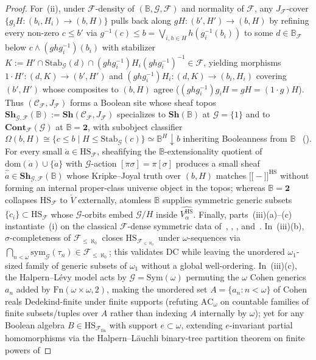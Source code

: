 \documentclass[10pt,twoside,openright]{book}
\providecommand{\llbracket}{\mathopen{[\![}}
\providecommand{\rrbracket}{\mathclose{]\!]}}
\theoremstyle{crmplain}
\theoremstyle{crmdef}
\theoremstyle{crmremark}
\begin{document}
\begin{proof}
For~(ii), under $\mathcal{F}$-density of $(\mathbb{B}, \mathcal{G}, \mathcal{F})$ and normality of $\mathcal{F}$, any $J_{\mathcal{F}}$-cover $\{g_i H : (b_i, H_i) \to (b, H)\}$ pulls back along $g H : (b', H') \to (b, H)$ by refining every non-zero $c \le b'$ via $g^{-1}(c) \le b = \bigvee_{i, h \in H} h(g_i^{-1}(b_i))$ to some $d \in \mathbb{B}_{\mathcal{F}}$ below $c \wedge (g h g_i^{-1})(b_i)$ with stabilizer $K := H' \cap \mathrm{Stab}_{\mathcal{G}}(d) \cap (g h g_i^{-1}) H_i (g h g_i^{-1})^{-1} \in \mathcal{F}$, yielding morphisms $1 \cdot H' : (d, K) \to (b', H')$ and $(g h g_i^{-1}) H_i : (d, K) \to (b_i, H_i)$ covering $(b', H')$ whose composites to $(b, H)$ agree ($(g h g_i^{-1}) g_i H = g H = (1 \cdot g) H$). Thus $(\mathcal{C}_{\mathcal{F}}, J_{\mathcal{F}})$ forms a Boolean site whose sheaf topos $\mathbf{Sh}_{\mathcal{G}, \mathcal{F}}(\mathbb{B}) := \mathbf{Sh}(\mathcal{C}_{\mathcal{F}}, J_{\mathcal{F}})$ specializes to $\mathbf{Sh}(\mathbb{B})$ at $\mathcal{G} = \{1\}$ and to $\mathbf{Cont}_{\mathcal{F}}(\mathcal{G})$ at $\mathbb{B} = \mathbf{2}$, with subobject classifier $\Omega(b, H) \cong \{c \le b \mid H \le \mathrm{Stab}_{\mathcal{G}}(c)\} \simeq \mathbb{B}^H{\downarrow}b$ inheriting Booleanness from $\mathbb{B}$~\cite{Fourman80} (\cite[\S D4.5]{Johnstone02}). For every small $\dot{a} \in \mathrm{HS}_{\mathcal{F}}$, sheafifying the $\mathbb{B}$-extensionality quotient of $\mathrm{dom}(\dot{a}) \cup \{\dot{a}\}$ with $\mathcal{G}$-action $[\pi\sigma] = \pi[\sigma]$ produces a small sheaf $\widehat{\dot{a}} \in \mathbf{Sh}_{\mathcal{G}, \mathcal{F}}(\mathbb{B})$ whose Kripke--Joyal truth over $(b, H)$ matches $\llbracket - \rrbracket^{\mathrm{HS}}$ without forming an internal proper-class universe object in the topos; whereas $\mathbb{B} = \mathbf{2}$ collapses $\mathrm{HS}_{\mathcal{F}}$ to $\check{V}$ externally, atomless $\mathbb{B}$ supplies symmetric generic subsets $\{\dot{c}_i\} \subset \mathrm{HS}_{\mathcal{F}}$ whose $\mathcal{G}$-orbits embed $\mathcal{G}/H$ inside $\widehat{V_\alpha^{\mathrm{HS}}}$. Finally, parts~(iii)(a)--(c) instantiate~(i) on the classical $\mathcal{F}$-dense symmetric data of~\cite[Chs.~5, 7, 10 \& \S 8.1]{Jech73}, \cite{HalpernLevy71}, \cite[Theorems~4.2--4.3]{Blass79}, and~\cite{Usuba21}. In~(iii)(b), $\sigma$-completeness of $\mathcal{F}_{\le \aleph_0}$ closes $\mathrm{HS}_{\mathcal{F}_{\le \aleph_0}}$ under $\omega$-sequences via $\bigcap_{n<\omega} \mathrm{sym}_{\mathcal{G}}(\tau_n) \in \mathcal{F}_{\le \aleph_0}$; this validates $\mathrm{DC}$ while leaving the unordered $\omega_1$-sized family of generic subsets of $\omega_1$ without a global well-ordering. In~(iii)(c), the Halpern--L\'evy model acts by $\mathcal{G} = \mathrm{Sym}(\omega)$ permuting the $\omega$ Cohen generics $a_n$ added by $\mathrm{Fn}(\omega \times \omega, 2)$, making the unordered set $A = \{a_n : n < \omega\}$ of Cohen reals Dedekind-finite under finite supports (refuting $\mathrm{AC}_\omega$ on countable families of finite subsets/tuples over $A$ rather than indexing $A$ internally by $\omega$); yet for any Boolean algebra $B \in \mathrm{HS}_{\mathcal{F}_{\mathrm{fin}}}$ with support $e \subset \omega$, extending $e$-invariant partial homomorphisms via the Halpern--L\"auchli binary-tree partition theorem on finite powers of 
\end{proof}
\end{document}
